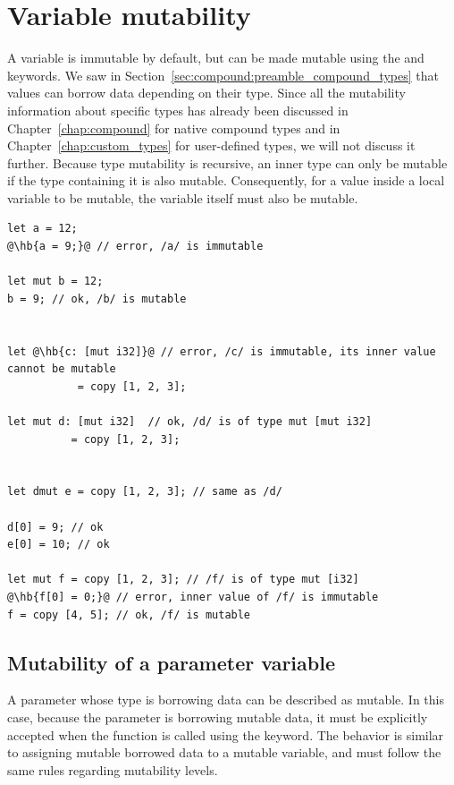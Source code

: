 \section{Variable mutability}
\label{sec:memory:variable_mutability}

A variable is immutable by default, but can be made mutable using the
 and  keywords. We saw in
Section~\ref{sec:compound:preamble_compound_types} that values can borrow data depending
on their type. Since all the mutability information about specific types has
already been discussed in Chapter~\ref{chap:compound} for native compound types
and in Chapter~\ref{chap:custom_types} for user-defined types, we will not
discuss it further. Because type mutability is recursive, an inner type can only
be mutable if the type containing it is also mutable. Consequently, for a value
inside a local variable to be mutable, the variable itself must also be mutable.

\begin{lstlisting}[style=coloredverbatimError, escapechar=@]
let a = 12;
@\hb{a = 9;}@ // error, /a/ is immutable

let mut b = 12;
b = 9; // ok, /b/ is mutable


let @\hb{c: [mut i32]}@ // error, /c/ is immutable, its inner value cannot be mutable
           = copy [1, 2, 3];

let mut d: [mut i32]  // ok, /d/ is of type mut [mut i32]
          = copy [1, 2, 3];


let dmut e = copy [1, 2, 3]; // same as /d/

d[0] = 9; // ok
e[0] = 10; // ok

let mut f = copy [1, 2, 3]; // /f/ is of type mut [i32]
@\hb{f[0] = 0;}@ // error, inner value of /f/ is immutable
f = copy [4, 5]; // ok, /f/ is mutable
\end{lstlisting}


\subsection{Mutability of a parameter variable}

A parameter whose type is borrowing data can be described as mutable. In this
case, because the parameter is borrowing mutable data, it must be explicitly
accepted when the function is called using the  keyword. The
behavior is similar to assigning mutable borrowed data to a mutable variable,
and must follow the same rules regarding mutability levels.

